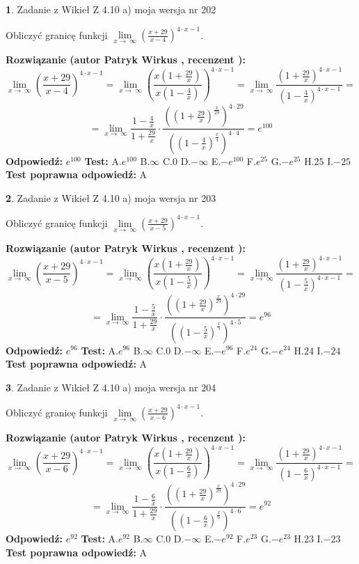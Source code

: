 \documentclass[12pt, a4paper]{article}
\theoremstyle{definition} %
\newtheorem{zad}{}
\newcommand{\zadStart}[1]{\begin{zad}#1\newline}
\newcommand{\zadStop}{\end{zad}}
\newcommand{\rozwStart}[2]{\noindent \textbf{Rozwiązanie (autor #1 , recenzent #2): }\newline}
\newcommand{\rozwStop}{\newline}
\newcommand{\odpStart}{\noindent \textbf{Odpowiedź:}\newline}
\newcommand{\odpStop}{\newline}
\newcommand{\testStart}{\noindent \textbf{Test:}\newline}
\newcommand{\testStop}{\newline}
\newcommand{\kluczStart}{\noindent \textbf{Test poprawna odpowiedź:}\newline}
\newcommand{\kluczStop}{\newline}
\begin{document}
\zadStart{Zadanie z Wikieł Z 4.10 a) moja wersja nr 202}

Obliczyć granicę funkcji  $\lim\limits_{x\to\ \infty}(\frac{x+29}{x-4})^{4\cdot x-1}$.
\zadStop
\rozwStart{Patryk Wirkus}{}
$$\lim\limits_{x\to\ \infty}(\frac{x+29}{x-4})^{4\cdot x-1} = \lim\limits_{x\to\ \infty}(\frac{x(1+\frac{29}{x})}{x(1-\frac{4}{x})})^{4\cdot x-1}=\lim\limits_{x\to\ \infty}\frac{(1+\frac{29}{x})^{4\cdot x-1}}{(1-\frac{4}{x})^{4\cdot x-1}}=$$
$$=\lim\limits_{x\to\ \infty}\frac{1-\frac{4}{x}}{1+\frac{29}{x}}\cdot\frac{((1+\frac{29}{x})^{\frac{x}{29}})^{4\cdot29}}{((1-\frac{4}{x})^{\frac{x}{4}})^{4\cdot4}}=e^{100}$$
\rozwStop
\odpStart
$e^{100}$
\odpStop
\testStart
A.$e^{100}$ B.$\infty$ C.$0$ D.$-\infty$ E.$-e^{100}$
F.$e^{25}$ G.$-e^{25}$
H.$25$
I.$-25$
\testStop
\kluczStart
A
\kluczStop



\zadStart{Zadanie z Wikieł Z 4.10 a) moja wersja nr 203}

Obliczyć granicę funkcji  $\lim\limits_{x\to\ \infty}(\frac{x+29}{x-5})^{4\cdot x-1}$.
\zadStop
\rozwStart{Patryk Wirkus}{}
$$\lim\limits_{x\to\ \infty}(\frac{x+29}{x-5})^{4\cdot x-1} = \lim\limits_{x\to\ \infty}(\frac{x(1+\frac{29}{x})}{x(1-\frac{5}{x})})^{4\cdot x-1}=\lim\limits_{x\to\ \infty}\frac{(1+\frac{29}{x})^{4\cdot x-1}}{(1-\frac{5}{x})^{4\cdot x-1}}=$$
$$=\lim\limits_{x\to\ \infty}\frac{1-\frac{5}{x}}{1+\frac{29}{x}}\cdot\frac{((1+\frac{29}{x})^{\frac{x}{29}})^{4\cdot29}}{((1-\frac{5}{x})^{\frac{x}{5}})^{4\cdot5}}=e^{96}$$
\rozwStop
\odpStart
$e^{96}$
\odpStop
\testStart
A.$e^{96}$ B.$\infty$ C.$0$ D.$-\infty$ E.$-e^{96}$
F.$e^{24}$ G.$-e^{24}$
H.$24$
I.$-24$
\testStop
\kluczStart
A
\kluczStop



\zadStart{Zadanie z Wikieł Z 4.10 a) moja wersja nr 204}

Obliczyć granicę funkcji  $\lim\limits_{x\to\ \infty}(\frac{x+29}{x-6})^{4\cdot x-1}$.
\zadStop
\rozwStart{Patryk Wirkus}{}
$$\lim\limits_{x\to\ \infty}(\frac{x+29}{x-6})^{4\cdot x-1} = \lim\limits_{x\to\ \infty}(\frac{x(1+\frac{29}{x})}{x(1-\frac{6}{x})})^{4\cdot x-1}=\lim\limits_{x\to\ \infty}\frac{(1+\frac{29}{x})^{4\cdot x-1}}{(1-\frac{6}{x})^{4\cdot x-1}}=$$
$$=\lim\limits_{x\to\ \infty}\frac{1-\frac{6}{x}}{1+\frac{29}{x}}\cdot\frac{((1+\frac{29}{x})^{\frac{x}{29}})^{4\cdot29}}{((1-\frac{6}{x})^{\frac{x}{6}})^{4\cdot6}}=e^{92}$$
\rozwStop
\odpStart
$e^{92}$
\odpStop
\testStart
A.$e^{92}$ B.$\infty$ C.$0$ D.$-\infty$ E.$-e^{92}$
F.$e^{23}$ G.$-e^{23}$
H.$23$
I.$-23$
\testStop
\kluczStart
A
\kluczStop
\end{document}
